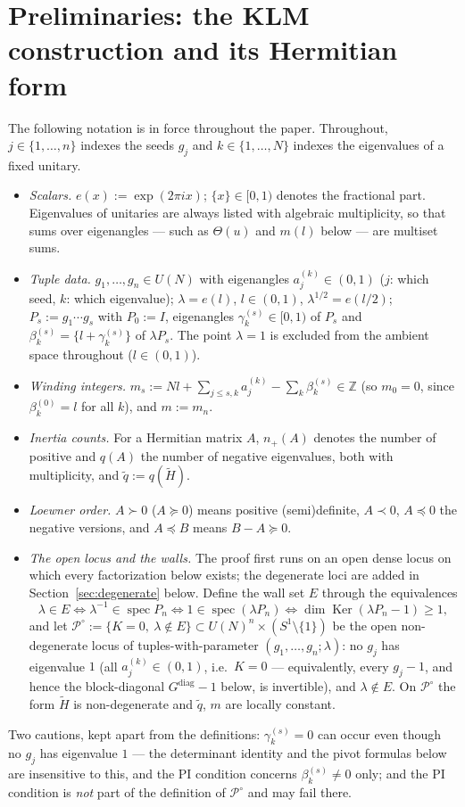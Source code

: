 \documentclass[11pt]{article}
\theoremstyle{definition}
\newcommand{\Z}{\mathbb Z}
\newcommand{\Ht}{\widetilde H}
\newcommand{\Ker}{\operatorname{Ker}}
\newcommand{\frc}[1]{\{#1\}}
\begin{document}
\section{Preliminaries: the KLM construction and its Hermitian form}
\label{sec:prelim}
The following notation is in force throughout the paper.
Throughout, $j\in\{1,\dots,n\}$ indexes the seeds $g_j$ and
$k\in\{1,\dots,N\}$ indexes the eigenvalues of a fixed unitary.
\begin{itemize}
\item[(a)] \emph{Scalars.} $e(x):=\exp(2\pi ix)$; $\frc{x}\in[0,1)$
denotes the fractional part. Eigenvalues of unitaries are always
listed with algebraic multiplicity, so that sums over eigenangles ---
such as $\Theta(u)$ and $m(l)$ below --- are multiset sums.
\item[(b)] \emph{Tuple data.} $g_1,\dots,g_n\in U(N)$ with eigenangles
$a_j^{(k)}\in(0,1)$ ($j$: which seed, $k$: which eigenvalue);
$\lambda=e(l)$, $l\in(0,1)$, $\lambda^{1/2}=e(l/2)$;
$P_s:=g_1\cdots g_s$ with $P_0:=I$, eigenangles
$\gamma^{(s)}_k\in[0,1)$ of $P_s$ and
$\beta^{(s)}_k=\frc{l+\gamma^{(s)}_k}$ of $\lambda P_s$. The point
$\lambda=1$ is excluded from the ambient space throughout
($l\in(0,1)$).
\item[(c)] \emph{Winding integers.}
$m_s:=Nl+\sum_{j\le s,k}a_j^{(k)}-\sum_k\beta^{(s)}_k\in\Z$ (so
$m_0=0$, since $\beta^{(0)}_k=l$ for all $k$), and $m:=m_n$.
\item[(d)] \emph{Inertia counts.} For a Hermitian matrix $A$,
$n_{+}(A)$ denotes the number of positive and $q(A)$ the number of
negative eigenvalues, both with multiplicity, and
$\widetilde q:=q(\Ht)$.
\item[(e)] \emph{Loewner order.} $A\succ0$ ($A\succeq0$) means
positive (semi)definite, $A\prec0$, $A\preceq0$ the negative
versions, and $A\preceq B$ means $B-A\succeq0$.
\item[(f)] \emph{The open locus and the walls.} The proof first runs
on an open dense locus on which every factorization below exists; the
degenerate loci are added in Section~\ref{sec:degenerate} below.
Define the wall set $E$ through the equivalences
\[
\lambda\in E
\iff \lambda^{-1}\in\operatorname{spec}P_n
\iff 1\in\operatorname{spec}(\lambda P_n)
\iff \dim\Ker(\lambda P_n-1)\ge1 ,
\]
and let
$\mathcal P^{\circ}:=\{K=0,\ \lambda\notin E\}
\subset U(N)^{n}\times(S^{1}\setminus\{1\})$ be the open
non-degenerate locus of tuples-with-parameter
$(g_1,\dots,g_n;\lambda)$: no $g_j$ has eigenvalue $1$ (all
$a_j^{(k)}\in(0,1)$, i.e.\ $K=0$ --- equivalently, every $g_j-1$,
and hence the block-diagonal $G^{\mathrm{diag}}-1$ below, is
invertible), and $\lambda\notin E$. On $\mathcal P^{\circ}$ the form
$\Ht$ is non-degenerate and $\widetilde q$, $m$ are locally
constant.
\end{itemize}
Two cautions, kept apart from the definitions: $\gamma^{(s)}_k=0$
can occur even though no $g_j$ has eigenvalue $1$ --- the
determinant identity and the pivot formulas below are insensitive to
this, and the PI condition concerns $\beta^{(s)}_k\neq0$ only; and
the PI condition is \emph{not} part of the definition of
$\mathcal P^{\circ}$ and may fail there.
\end{document}
